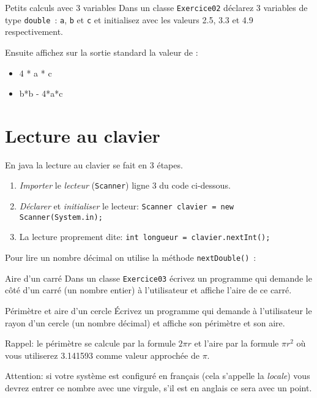 \documentclass[a4paper,11pt]{article}
\begin{document}
	\begin{Exercice}{Petits calculs avec 3 variables} 
		Dans un classe \texttt{Exercice02} déclarez 3 variables de type \texttt{double}~: 
		\texttt{a}, \texttt{b} et \texttt{c} et initialisez avec les valeurs 
		2.5, 3.3 et 4.9 respectivement.
		
		Ensuite affichez sur la sortie standard la valeur de :
		\begin{itemize}
		 	\item 4 * a * c
			\item b*b - 4*a*c
		\end{itemize} 
	\end{Exercice}


\newpage
\section{Lecture au clavier}


	En java la lecture au clavier se fait en 3 étapes.

	\begin{enumerate}
		\item \emph{Importer} le \emph{lecteur} (\texttt{Scanner}) ligne 3 du code ci-dessous.
		\item \emph{Déclarer} et \emph{initialiser} le lecteur:  \texttt{Scanner clavier = new Scanner(System.in);}
		\item La lecture proprement dite: \texttt{int longueur = clavier.nextInt();}
	\end{enumerate}


	Pour lire un nombre décimal on utilise la méthode \texttt{nextDouble()}~:
	


	\begin{Exercice}{Aire d'un carré}
		Dans un classe \texttt{Exercice03} écrivez un programme qui demande 
		le côté d'un carré (un nombre entier) à l'utilisateur et 
		affiche l'aire de ce carré.
	\end{Exercice}
	
	\begin{Exercice}{Périmètre et aire d'un cercle}
		\'Ecrivez un programme
		qui demande à l'utilisateur le rayon d'un cercle (un nombre décimal)
		et affiche son périmètre et son aire.
	
		Rappel: le périmètre se calcule par la formule $2\pi r$ et 
		l'aire par la formule $\pi r^2$ où vous utiliserez 3.141593 comme valeur
		approchée de $\pi$.
	
		Attention: si votre système est configuré en français (cela s'appelle la 
		\emph{locale}) 
		vous devrez entrer ce nombre avec une virgule, s'il est en anglais ce sera avec
		un point.
	\end{Exercice}
\end{document}
